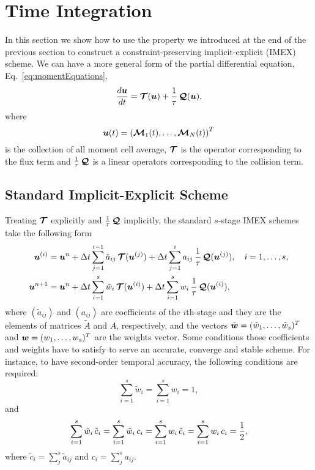 \section{Time Integration} \label{se:TimeIntegration}

In this section we show how to use the property we introduced at the end of the previous section to construct a constraint-preserving implicit-explicit (IMEX) scheme.
We can have a more general form of the partial differential equation, Eq.~\eqref{eq:momentEquations},
\begin{equation}
  \dfrac{d \boldsymbol{u}}{d t} = \boldsymbol{\mathcal{T}}(\boldsymbol{u}) + \frac{1}{\tau}\,\boldsymbol{\mathcal{Q}}(\boldsymbol{u}),
\end{equation}
where
\begin{equation}
\boldsymbol{u}(t) = \left( \boldsymbol{\mathcal{M}}_{1}(t),\ldots,\boldsymbol{\mathcal{M}}_{N}(t)\right) ^{T}
\end{equation}
is the collection of all moment cell average, $\boldsymbol{\mathcal{T}}$ is the operator corresponding to the flux term and $\frac{1}{\tau}\,\boldsymbol{\mathcal{Q}}$ is a linear operators corresponding to the collision term.


\subsection{Standard Implicit-Explicit Scheme}
Treating $\boldsymbol{\mathcal{T}}$ explicitly and $\frac{1}{\tau}\,\boldsymbol{\mathcal{Q}}$ implicitly, the standard $s$-stage IMEX schemes take the following form 
\begin{align}
  \boldsymbol{u}^{(i)}
  &=\boldsymbol{u}^{n}
  +\Delta t\sum_{j=1}^{i-1}\tilde{a}_{ij}\,\boldsymbol{\mathcal{T}}(\boldsymbol{u}^{(j)})
  +\Delta t\sum_{j=1}^{i}a_{ij}\,\frac{1}{\tau}\,\boldsymbol{\mathcal{Q}}(\boldsymbol{u}^{(j)}),
  \quad i=1,\ldots,s, \label{imexStages} \\
  \boldsymbol{u}^{n+1}
  &=\boldsymbol{u}^{n}
  +\Delta t\sum_{i=1}^{s}\tilde{w}_{i}\,\boldsymbol{\mathcal{T}}(\boldsymbol{u}^{(i)})
  +\Delta t\sum_{i=1}^{s}w_{i}\,\frac{1}{\tau}\,\boldsymbol{\mathcal{Q}}(\boldsymbol{u}^{(i)}), \label{imexIntermediate} 
\end{align}
where  $(\tilde{a}_{ij})$ and $(a_{ij})$ are coefficients of the $i$th-stage and they are the elements of matrices $\tilde{A}$ and $A$, respectively, and the vectors $\tilde{\boldsymbol{w}}=(\tilde{w}_{1},\ldots,\tilde{w}_{s})^{T}$ and $\boldsymbol{w}=(w_{1},\ldots,w_{s})^{T}$ are the weights vector.
Some conditions those coefficients and weights have to satisfy to serve an accurate, converge and stable scheme.
For instance, to have second-order temporal accuracy, the following conditions are required:
\begin{equation}
  \sum_{i=1}^{s}\tilde{w}_{i}=\sum_{i=1}^{s}w_{i}=1,
  \label{orderConditions1}
\end{equation}
and
\begin{equation}
  \sum_{i=1}^{s}\tilde{w}_{i}\,\tilde{c}_{i}
  =\sum_{i=1}^{s}\tilde{w}_{i}\,c_{i}
  =\sum_{i=1}^{s}w_{i}\,\tilde{c}_{i}
  =\sum_{i=1}^{s}w_{i}\,c_{i}=\frac{1}{2}, 
  \label{orderConditions2}
\end{equation}
where $\tilde{c}_{i} = \sum_{j}^{s}\tilde{a}_{ij}$ and $c_{i}=\sum_{j}^{s}a_{ij}$.

